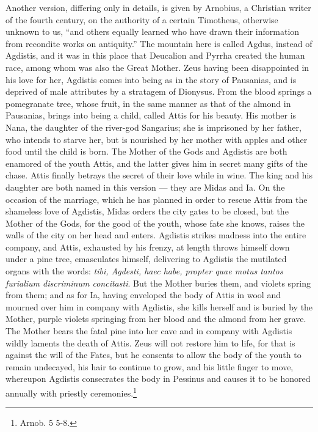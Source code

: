 \documentclass[a4paper, 11pt, oneside, polutonikogreek, english]{article}
\begin{document}
Another version, differing only in details, is given by Arnobius, a Christian writer of the fourth century, on the authority of a certain Timotheus, otherwise unknown to us, ``and others equally learned who have drawn their information from recondite works on antiquity.'' The mountain here is called Agdus, instead of Agdistis, and it was in this place that Deucalion and Pyrrha created the human race, among whom was also the Great Mother. Zeus having been disappointed in his love for her, Agdistis comes into being as in the story of Pausanias, and is deprived of male attributes by a stratagem of Dionysus. From the blood springs a pomegranate tree, whose fruit, in the same manner as that of the almond in Pausanias, brings into being a child, called Attis for his beauty. His mother is Nana, the daughter of the river-god Sangarius; she is imprisoned by her father, who intends to starve her, but is nourished by her mother with apples and other food until the child is born. The Mother of the Gods and Agdistis are both enamored of the youth Attis, and the latter gives him in secret many gifts of the chase. Attis finally betrays the secret of their love while in wine. The king and his daughter are both named in this version --- they are Midas and Ia. On the occasion of the marriage, which he has planned in order to rescue Attis from the shameless love of Agdistis, Midas orders the city gates to be closed, but the Mother of the Gods, for the good of the youth, whose fate she knows, raises the walls of the city on her head and enters. Agdistis strikes madness into the entire company, and Attis, exhausted by his frenzy, at length throws himself down under a pine tree, emasculates himself, delivering to Agdistis the mutilated organs with the words: \emph{tibi, Agdesti, haec habe, propter quae motus tantos furialium discriminum concitasti}. But the Mother buries them, and violets spring from them; and as for Ia, having enveloped the body of Attis in wool and mourned over him in company with Agdistis, she kills herself and is buried by the Mother, purple violets springing from her blood and the almond from her grave. The Mother bears the fatal pine into her cave and in company with Agdistis wildly laments the death of Attis. Zeus will not restore him to life, for that is against the will of the Fates, but he consents to allow the body of the youth to remain undecayed, his hair to continue to grow, and his little finger to move, whereupon Agdistis consecrates the body in Pessinus and causes it to be honored annually with priestly ceremonies.\footnote{Arnob. 5 5-8.}
\end{document}
